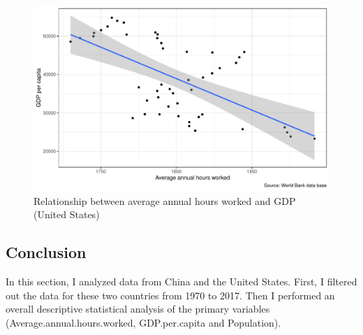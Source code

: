 \documentclass[11pt,a4paper,]{article}
\begin{document}
\begin{Shaded}
\begin{Highlighting}[]
\SpecialCharTok{\%\textgreater{}\%}
    \SpecialCharTok{==}\NormalTok{)}\SpecialCharTok{\%\textgreater{}\%}
    \NormalTok{(} \NormalTok{(}
                          \SpecialCharTok{+}
    \NormalTok{() }\SpecialCharTok{+} 
    \NormalTok{(}\SpecialCharTok{+}
  \NormalTok{(}\NormalTok{, }
       \NormalTok{, }
        \NormalTok{)}\SpecialCharTok{+}
    \NormalTok{()}
\end{Highlighting}
\end{Shaded}

\begin{figure}
\centering
\includegraphics{report_files/figure-latex/Figure4-1.pdf}
\caption{\label{fig:Figure4}Relationship between average annual hours worked and GDP (United States)}
\end{figure}

\hypertarget{conclusion}{%
\subsection{Conclusion}\label{conclusion}}

In this section, I analyzed data from China and the United States. First, I filtered out the data for these two countries from 1970 to 2017. Then I performed an overall descriptive statistical analysis of the primary variables (Average.annual.hours.worked, GDP.per.capita and Population).
\end{document}
